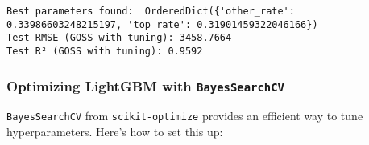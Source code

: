 \documentclass[
  letterpaper,
  DIV=11,
  numbers=noendperiod]{scrreprt}
\begin{document}
\begin{verbatim}
Best parameters found:  OrderedDict({'other_rate': 0.33986603248215197, 'top_rate': 0.31901459322046166})
Test RMSE (GOSS with tuning): 3458.7664
Test R² (GOSS with tuning): 0.9592
\end{verbatim}

\subsubsection{\texorpdfstring{Optimizing LightGBM with
\texttt{BayesSearchCV}}{Optimizing LightGBM with BayesSearchCV}}\label{optimizing-lightgbm-with-bayessearchcv}

\texttt{BayesSearchCV} from \texttt{scikit-optimize} provides an
efficient way to tune hyperparameters. Here's how to set this up:
\end{document}
